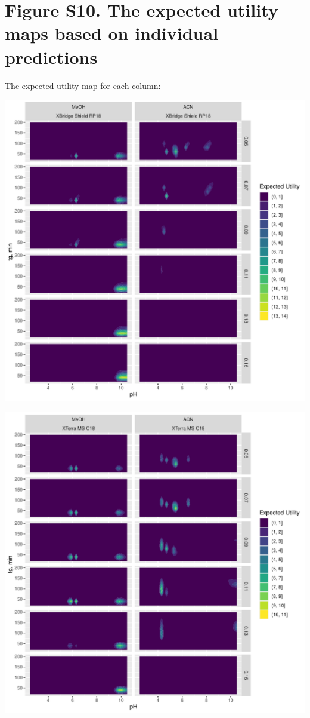 \documentclass[
]{article}
\begin{document}
\newpage{}

\hypertarget{figure-s10.-the-expected-utility-maps-based-on-individual-predictions}{%
\section{Figure S10. The expected utility maps based on individual
predictions}\label{figure-s10.-the-expected-utility-maps-based-on-individual-predictions}}

The expected utility map for each column:

\includegraphics{../figures/casestudy1/utilitymap/utilitymap1.pdf}

\newpage{}

\includegraphics{../figures/casestudy1/utilitymap/utilitymap2.pdf}
\end{document}
